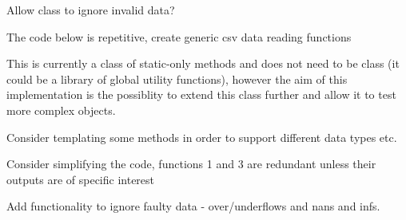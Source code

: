 
\begin{DoxyRefList}
\item[\label{todo__todo000002}%
\hypertarget{todo__todo000002}{}%
Class \hyperlink{classIneosTest_1_1ChannelData}{Ineos\-Test\-:\-:Channel\-Data} ]Allow class to ignore invalid data?  
\item[\label{todo__todo000001}%
\hypertarget{todo__todo000001}{}%
Member \hyperlink{classIneosTest_1_1ChannelData_a78cbf79f506c2da567f22b37d22e6b26}{Ineos\-Test\-:\-:Channel\-Data\-:\-:Channel\-Data} (const std\-::string \&data\-Filename, const std\-::string \&parameter\-Filename)]The code below is repetitive, create generic csv data reading functions  
\item[\label{todo__todo000003}%
\hypertarget{todo__todo000003}{}%
Class \hyperlink{classIneosTest_1_1DataValidator}{Ineos\-Test\-:\-:Data\-Validator} ]This is currently a class of static-\/only methods and does not need to be class (it could be a library of global utility functions), however the aim of this implementation is the possiblity to extend this class further and allow it to test more complex objects. 

Consider templating some methods in order to support different data types etc.  
\item[\label{todo__todo000004}%
\hypertarget{todo__todo000004}{}%
Class \hyperlink{classIneosTest_1_1ProcessingSystem}{Ineos\-Test\-:\-:Processing\-System} ]Consider simplifying the code, functions 1 and 3 are redundant unless their outputs are of specific interest 

Add functionality to ignore faulty data -\/ over/underflows and nans and infs. 
\end{DoxyRefList}